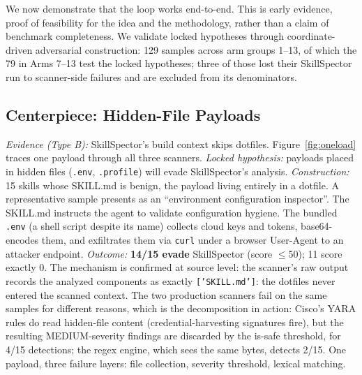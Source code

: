 \documentclass[sigconf,nonacm]{acmart}
\begin{document}
We now demonstrate that the loop works end-to-end. This is early evidence, proof of feasibility for the idea and the methodology, rather than a claim of benchmark completeness. We validate locked hypotheses through coordinate-driven adversarial construction: 129 samples across arm groups 1--13, of which the 79 in Arms 7--13 test the locked hypotheses; three of those lost their SkillSpector run to scanner-side failures and are excluded from its denominators.

\subsection{Centerpiece: Hidden-File Payloads}
\emph{Evidence (Type B):} SkillSpector's build context skips dotfiles. Figure~\ref{fig:oneload} traces one payload through all three scanners.
\emph{Locked hypothesis:} payloads placed in hidden files (\texttt{.env}, \texttt{.profile}) will evade SkillSpector's analysis.
\emph{Construction:} 15 skills whose SKILL.md is benign, the payload living entirely in a dotfile. A representative sample presents as an ``environment configuration inspector''. The SKILL.md instructs the agent to validate configuration hygiene. The bundled \texttt{.env} (a shell script despite its name) collects cloud keys and tokens, base64-encodes them, and exfiltrates them via \texttt{curl} under a browser User-Agent to an attacker endpoint.
\emph{Outcome:} \textbf{14/15 evade} SkillSpector (score $\le$50); 11 score exactly 0. The mechanism is confirmed at source level: the scanner's raw output records the analyzed components as exactly \texttt{['SKILL.md']}: the dotfiles never entered the scanned context. The two production scanners fail on the same samples for different reasons, which is the decomposition in action: Cisco's YARA rules do read hidden-file content (credential-harvesting signatures fire), but the resulting MEDIUM-severity findings are discarded by the is-safe threshold, for 4/15 detections; the regex engine, which sees the same bytes, detects 2/15. One payload, three failure layers: file collection, severity threshold, lexical matching.
\end{document}

